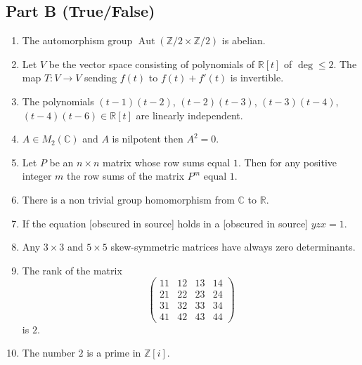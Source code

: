 \documentclass[11pt, a4paper]{article}
\begin{document}
\subsection*{Part B (True/False)}
\begin{enumerate}[resume]
  \item The automorphism group $\operatorname{Aut}(\mathbb{Z}/2 \times \mathbb{Z}/2)$ is abelian.
  \item Let $V$ be the vector space consisting of polynomials of $\mathbb{R}[t]$ of $\deg \le 2$. The map $T: V \to V$ sending $f(t)$ to $f(t) + f'(t)$ is invertible.
  \item The polynomials $(t - 1)(t - 2)$, $(t - 2)(t - 3)$, $(t - 3)(t - 4)$, $(t - 4)(t - 6) \in \mathbb{R}[t]$ are linearly independent.
  \item $A \in M_2(\mathbb{C})$ and $A$ is nilpotent then $A^2 = 0$.
  \item Let $P$ be an $n \times n$ matrix whose row sums equal $1$. Then for any positive integer $m$ the row sums of the matrix $P^m$ equal $1$.
  \item There is a non trivial group homomorphism from $\mathbb{C}$ to $\mathbb{R}$.
  \item If the equation {[obscured in source]} holds in a {[obscured in source]} $yzx = 1$.
  \item Any $3 \times 3$ and $5 \times 5$ skew-symmetric matrices have always zero determinants.
  \item The rank of the matrix
  \[
    \begin{pmatrix}
      11 & 12 & 13 & 14 \\
      21 & 22 & 23 & 24 \\
      31 & 32 & 33 & 34 \\
      41 & 42 & 43 & 44
    \end{pmatrix}
  \]
  is $2$.
  \item The number $2$ is a prime in $\mathbb{Z}[i]$.
\end{enumerate}
\end{document}
